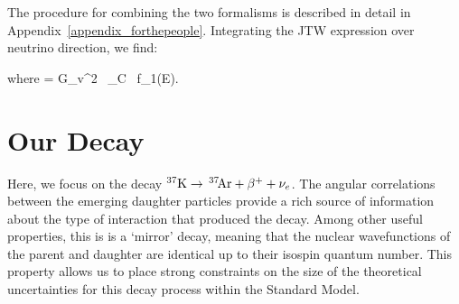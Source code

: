 	
	The procedure for combining the two formalisms is described in detail in Appendix~\ref{appendix_forthepeople}.  
Integrating the JTW expression over neutrino direction, we find:

where 
\bea
\xi = G_v^2 \, \cos\theta_C \, f_1(E).
\eea



\section{Our Decay}

Here, we focus on the decay $^{37}\textrm{K} \rightarrow \,^{37}\textrm{\!Ar} + \beta^{+} + \nu_e$.  The angular correlations between the emerging daughter particles provide a rich source of information about the type of interaction that produced the decay.  Among other useful properties, this is is a `mirror' decay, meaning that the nuclear wavefunctions of the parent and daughter are identical up to their isospin quantum number.  This property allows us to place strong constraints on the size of the theoretical uncertainties for this decay process within the Standard Model.  



